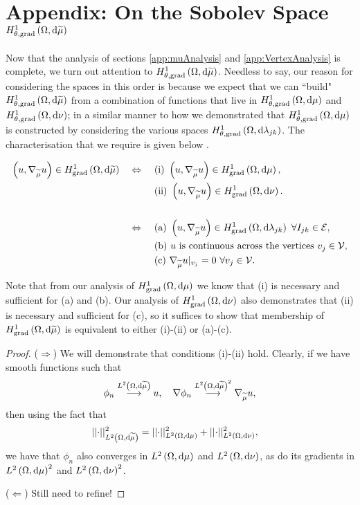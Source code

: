 \section{Appendix: On the Sobolev Space $H^1_{\theta, \mathrm{grad}}\left( \Omega, \mathrm{d}\widetilde{\mu} \right)$} \label{app:SumMeasureAnalysis}
Now that the analysis of sections \ref{app:muAnalysis} and \ref{app:VertexAnalysis} is complete, we turn out attention to $H^1_{\theta, \mathrm{grad}}\left( \Omega, \mathrm{d}\widetilde{\mu} \right)$.
Needless to say, our reason for considering the spaces in this order is because we expect that we can ``build" $H^1_{\theta, \mathrm{grad}}\left( \Omega, \mathrm{d}\widetilde{\mu} \right)$ from a combination of functions that live in $H^1_{\theta, \mathrm{grad}}\left( \Omega, \mathrm{d}\mu \right)$ and $H^1_{\theta, \mathrm{grad}}\left( \Omega, \mathrm{d}\nu \right)$; in a similar manner to how we demonstrated that $H^1_{\theta, \mathrm{grad}}\left( \Omega, \mathrm{d}\mu \right)$ is constructed by considering the various spaces $H^1_{\theta, \mathrm{grad}}\left( \Omega, \mathrm{d}\lambda_{jk} \right)$.
The characterisation that we require is given below .
\begin{conjecture} \label{conj:ThickVertexSpaceCharacterisation}
	\begin{align*}
		\left( u, \nabla_{\widetilde{\mu}}u \right)\in H^1_\mathrm{grad}\left( \Omega, \mathrm{d}\widetilde{\mu} \right) \quad\Leftrightarrow\quad
		& \ \text{(i)} \ \left( u, \nabla_{\widetilde{\mu}}u \right)\in H^1_\mathrm{grad}\left( \Omega, \mathrm{d}\mu \right), \\
		& \ \text{(ii)} \ \left( u, \nabla_{\widetilde{\mu}}u \right)\in H^1_\mathrm{grad}\left( \Omega, \mathrm{d}\nu \right). \\
		\\
		\quad\Leftrightarrow\quad
		& \ \text{(a)} \ \left( u, \nabla_{\widetilde{\mu}}u \right)\in H^1_\mathrm{grad}\left( \Omega, \mathrm{d}\lambda_{jk} \right) \ \forall I_{jk}\in\mathcal{E}, \\
		& \ \text{(b)} \ u \text{ is continuous across the vertices} \ v_j\in\mathcal{V}, \\
		& \ \text{(c)} \ \nabla_{\widetilde{\mu}}u\vert_{v_j} = 0 \ \forall v_j\in\mathcal{V}.
	\end{align*}
\end{conjecture}
Note that from our analysis of $H^1_\mathrm{grad}\left( \Omega, \mathrm{d}\mu \right)$ we know that (i) is necessary and sufficient for (a) and (b).
Our analysis of $H^1_\mathrm{grad}\left( \Omega, \mathrm{d}\nu \right)$ also demonstrates that (ii) is necessary and sufficient for (c), so it suffices to show that membership of $H^1_\mathrm{grad}\left( \Omega, \mathrm{d}\widetilde{\mu} \right)$ is equivalent to either (i)-(ii) or (a)-(c).
\begin{proof}
	($\Rightarrow$) We will demonstrate that conditions (i)-(ii) hold.
	Clearly, if we have smooth functions such that
	\begin{align*}
		\phi_n \overset{L^{2}\left( \Omega,\mathrm{d}\widetilde{\mu} \right)}{\longrightarrow} u, \quad \nabla\phi_n\overset{L^{2}\left( \Omega,\mathrm{d}\widetilde{\mu} \right)^2}{\longrightarrow}\nabla_{\widetilde{\mu}}u,
	\end{align*}
	then using the fact that
	\begin{align*}
		\lvert\lvert \cdot \rvert\rvert_{L^{2}\left( \Omega,\mathrm{d}\widetilde{\mu} \right)}^2 &= \lvert\lvert \cdot \rvert\rvert_{L^{2}\left( \Omega,\mathrm{d}\mu \right)}^2 + \lvert\lvert \cdot \rvert\rvert_{L^{2}\left( \Omega,\mathrm{d}\nu \right)}^2,
	\end{align*}
	we have that $\phi_n$ also converges in $L^{2}\left( \Omega,\mathrm{d}\mu \right)$ and $L^{2}\left( \Omega,\mathrm{d}\nu \right)$, as do its gradients in $L^{2}\left( \Omega,\mathrm{d}\mu \right)^2$ and $L^{2}\left( \Omega,\mathrm{d}\nu \right)^2$. \newline
	
	($\Leftarrow$) Still need to refine!
\end{proof}
